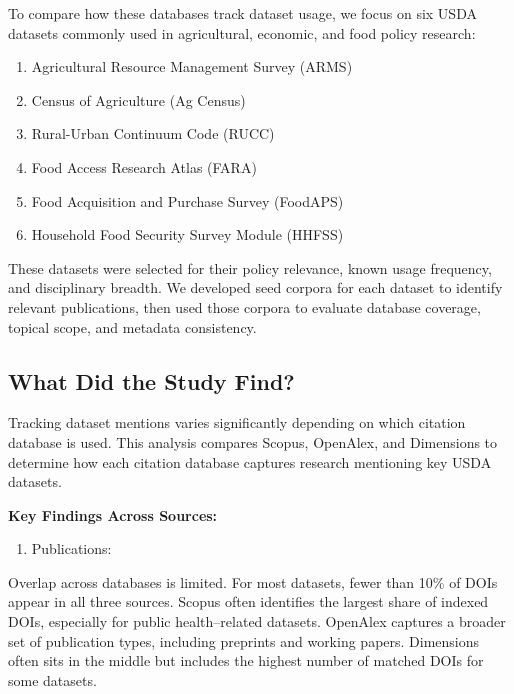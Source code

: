 \documentclass[
  letterpaper,
  DIV=11,
  numbers=noendperiod]{scrartcl}
\providecommand{\tightlist}{%
  \setlength{\itemsep}{0pt}\setlength{\parskip}{0pt}}\usepackage{longtable,booktabs,array}
\begin{document}
To compare how these databases track dataset usage, we focus on six USDA
datasets commonly used in agricultural, economic, and food policy
research:

\begin{enumerate}
\def\labelenumi{\arabic{enumi}.}
\tightlist
\item
  Agricultural Resource Management Survey (ARMS)
\item
  Census of Agriculture (Ag Census)
\item
  Rural-Urban Continuum Code (RUCC)
\item
  Food Access Research Atlas (FARA)
\item
  Food Acquisition and Purchase Survey (FoodAPS)
\item
  Household Food Security Survey Module (HHFSS)
\end{enumerate}

These datasets were selected for their policy relevance, known usage
frequency, and disciplinary breadth. We developed seed corpora for each
dataset to identify relevant publications, then used those corpora to
evaluate database coverage, topical scope, and metadata consistency.

\subsection*{What Did the Study Find?}\label{what-did-the-study-find}

Tracking dataset mentions varies significantly depending on which
citation database is used. This analysis compares Scopus, OpenAlex, and
Dimensions to determine how each citation database captures research
mentioning key USDA datasets.

\textbf{Key Findings Across Sources:}

\begin{enumerate}
\def\labelenumi{\arabic{enumi}.}
\tightlist
\item
  Publications:
\end{enumerate}

Overlap across databases is limited. For most datasets, fewer than 10\%
of DOIs appear in all three sources. Scopus often identifies the largest
share of indexed DOIs, especially for public health--related datasets.
OpenAlex captures a broader set of publication types, including
preprints and working papers. Dimensions often sits in the middle but
includes the highest number of matched DOIs for some datasets.
\end{document}
